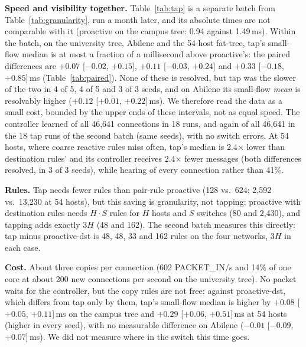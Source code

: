 \documentclass[sigconf]{acmart}
\begin{document}
\textbf{Speed and visibility together.} Table~\ref{tab:tap} is a separate batch from Table~\ref{tab:granularity}, run a month later, and its absolute times are not comparable with it (proactive on the campus tree: 0.94 against 1.49\,ms). Within the batch, on the university tree, Abilene and the 54-host fat-tree, tap's small-flow median is at most a fraction of a millisecond above proactive's: the paired differences are $+0.07$ [$-0.02$, $+0.15$], $+0.11$ [$-0.03$, $+0.24$] and $+0.33$ [$-0.18$, $+0.85$]\,ms (Table~\ref{tab:paired}). None of these is resolved, but tap was the slower of the two in 4 of 5, 4 of 5 and 3 of 3 seeds, and on Abilene its small-flow \emph{mean} is resolvably higher ($+0.12$ [$+0.01$, $+0.22$]\,ms). We therefore read the data as a small cost, bounded by the upper ends of these intervals, not as equal speed. The controller learned of all 46,641 connections in 18 runs, and again of all 46,641 in the 18 tap runs of the second batch (same seeds), with no switch errors. At 54 hosts, where coarse reactive rules miss often, tap's median is 2.4$\times$ lower than destination rules' and its controller receives 2.4$\times$ fewer messages (both differences resolved, in 3 of 3 seeds), while hearing of every connection rather than 41\%.

\textbf{Rules.} Tap needs fewer rules than pair-rule proactive (128 vs.\ 624; 2,592 vs.\ 13,230 at 54 hosts), but this saving is granularity, not tapping: proactive with destination rules needs $H\cdot S$ rules for $H$ hosts and $S$ switches (80 and 2,430), and tapping adds exactly $3H$ (48 and 162). The second batch measures this directly: tap minus proactive-dst is 48, 48, 33 and 162 rules on the four networks, $3H$ in each case.

\textbf{Cost.} About three copies per connection (602 PACKET\_IN/s and 14\% of one core at about 200 new connections per second on the university tree). No packet waits for the controller, but the copy rules are not free: against proactive-dst, which differs from tap only by them, tap's small-flow median is higher by $+0.08$ [$+0.05$, $+0.11$]\,ms on the campus tree and $+0.29$ [$+0.06$, $+0.51$]\,ms at 54 hosts (higher in every seed), with no measurable difference on Abilene ($-0.01$ [$-0.09$, $+0.07$]\,ms). We did not measure where in the switch this time goes.
\end{document}
